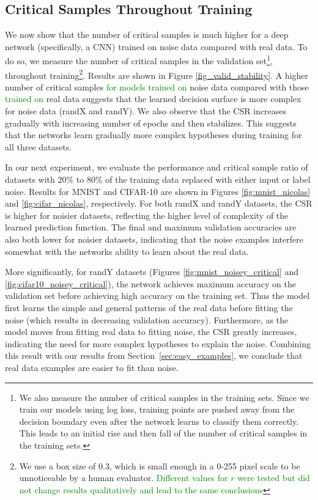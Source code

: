 \documentclass{article}
\newcommand{\af}[1]{\textcolor{green}{#1}}
\newcommand{\af}[1]{\textcolor{black}{#1}}
\begin{document}
\subsection{Critical Samples Throughout Training}
\label{sec_CS}
We now show that the number of critical samples is much higher for a deep network (specifically, a CNN) trained on noise data compared with real data.
To do so, we measure the number of critical samples in the validation set\footnote{
We also measure the number of critical samples in the training sets. Since we train our models using log loss, training points are pushed away from the decision boundary even after the network learns to classify them correctly. This leads to an initial rise and then fall of the number of critical samples in the training sets.
},
throughout training\footnote{We use a box size of 0.3, which is small enough in a 0-255 pixel scale to be unnoticeable by a human evaluator. \af{Different values for $r$ were tested but did not change results qualitatively and lead to the same conclusions}}.
Results are shown in Figure \ref{fig_valid_stability}.
A higher number of critical samples \af{for models trained on} noise data compared with those \af{trained on} real data suggests that the learned decision surface is more complex for noise data (randX and randY).
We also observe that the CSR increases gradually with increasing number of epochs and then stabilizes. This suggests that the networks learn gradually more complex hypotheses during training for all three datasets.


In our next experiment, we evaluate the performance and critical sample ratio of datasets with $ 20\% $ to  $ 80 \% $ of the training data replaced with either input or label noise.
Results for MNIST and CIFAR-10 are shown in Figures \ref{fig:mnist_nicolas} and \ref{fig:cifar_nicolas}, respectively.
For both randX and randY datasets, the CSR is higher for noisier datasets, reflecting the higher level of complexity of the learned prediction function. 
The final and maximum validation accuracies are also both lower for noisier datasets, indicating that the noise examples interfere somewhat with the networks ability to learn about the real data.

More significantly, for randY datasets (Figures \ref{fig:mnist_noisey_critical} and \ref{fig:cifar10_noisey_critical}), the network achieves maximum accuracy on the validation set before achieving high accuracy on the training set.
Thus the model first learns the simple and general patterns of the real data before fitting the noise (which results in decreasing validation accuracy).
Furthermore, as the model moves from fitting real data to fitting noise, the CSR greatly increases, indicating the need for more complex hypotheses to explain the noise.
Combining this result with our results from Section~\ref{sec:easy_examples}, we conclude that real data examples are easier to fit than noise.
\end{document}
